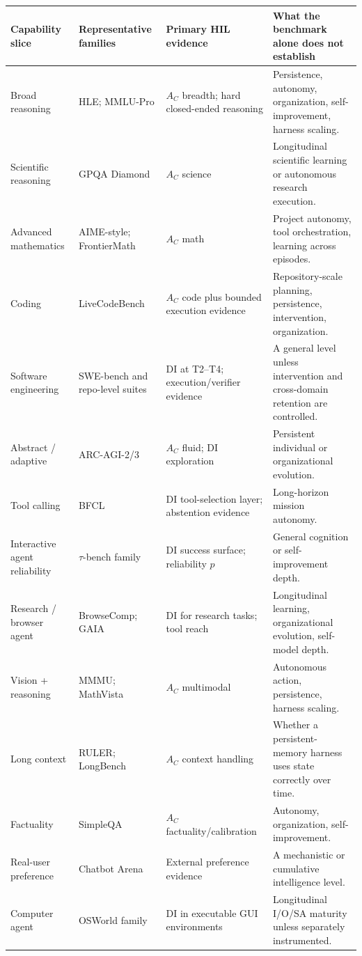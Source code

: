 \documentclass[11pt]{article}
\theoremstyle{definition}
\begin{document}
\begin{table}[h]
\centering\scriptsize
\begin{tabularx}{\textwidth}{@{}lZZZ@{}}
\toprule
Capability slice & Representative families & Primary HIL evidence & What the benchmark alone does not establish \\
\midrule
Broad reasoning & HLE; MMLU-Pro & $A_C$ breadth; hard closed-ended reasoning & Persistence, autonomy, organization, self-improvement, harness scaling. \\
Scientific reasoning & GPQA Diamond & $A_C$ science & Longitudinal scientific learning or autonomous research execution. \\
Advanced mathematics & AIME-style; FrontierMath & $A_C$ math & Project autonomy, tool orchestration, learning across episodes. \\
Coding & LiveCodeBench & $A_C$ code plus bounded execution evidence & Repository-scale planning, persistence, intervention, organization. \\
Software engineering & SWE-bench and repo-level suites & DI at T2--T4; execution/verifier evidence & A general level unless intervention and cross-domain retention are controlled. \\
Abstract / adaptive & ARC-AGI-2/3 & $A_C$ fluid; DI exploration & Persistent individual or organizational evolution. \\
Tool calling & BFCL & DI tool-selection layer; abstention evidence & Long-horizon mission autonomy. \\
Interactive agent reliability & $\tau$-bench family & DI success surface; reliability $p$ & General cognition or self-improvement depth. \\
Research / browser agent & BrowseComp; GAIA & DI for research tasks; tool reach & Longitudinal learning, organizational evolution, self-model depth. \\
Vision + reasoning & MMMU; MathVista & $A_C$ multimodal & Autonomous action, persistence, harness scaling. \\
Long context & RULER; LongBench & $A_C$ context handling & Whether a persistent-memory harness uses state correctly over time. \\
Factuality & SimpleQA & $A_C$ factuality/calibration & Autonomy, organization, self-improvement. \\
Real-user preference & Chatbot Arena & External preference evidence & A mechanistic or cumulative intelligence level. \\
Computer agent & OSWorld family & DI in executable GUI environments & Longitudinal I/O/SA maturity unless separately instrumented. \\
\bottomrule
\end{tabularx}
\end{table}
\end{document}
